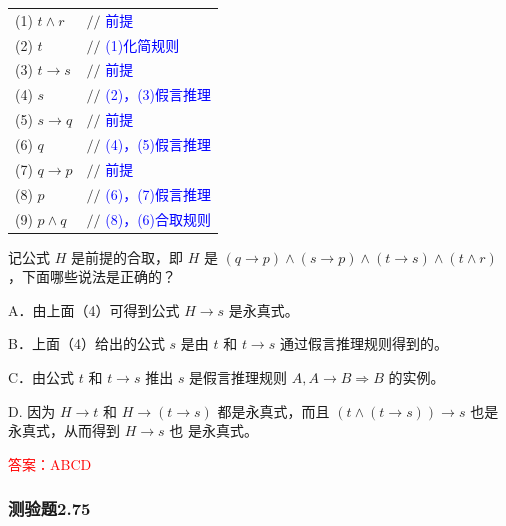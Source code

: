 \documentclass[UTF8, heading=true]{ctexart}
\begin{document}
\begin{table}[htbp]
  \centering
  \renewcommand{\arraystretch}{1.5}
  \begin{tabular}{ll}
    (1)  $t \wedge r$ & $/ / $ \textcolor{blue}{{前提}} \\
    (2)  $t$ & $/ / $ \textcolor{blue}{{(1)化简规则}} \\
    (3)  $t \rightarrow s$ & $/ / $ \textcolor{blue}{{前提}} \\
    (4)  $s$ & $/ / $ \textcolor{blue}{{(2)，(3)假言推理}} \\
    (5)  $s \rightarrow q$ & $/ / $ \textcolor{blue}{{前提}} \\
    (6)  $q$ & $/ / $ \textcolor{blue}{{(4)，(5)假言推理}} \\
    (7)  $q \rightarrow p$ & $/ / $ \textcolor{blue}{{前提}} \\
    (8)  $p$ & $/ / $ \textcolor{blue}{{(6)，(7)假言推理}} \\
    (9)  $p \wedge q$ & $/ / $ \textcolor{blue}{{(8)，(6)合取规则}} \\
  \end{tabular}
\end{table}


记公式 $H$ 是前提的合取，即 $H$ 是 $(q \rightarrow p) \wedge(s \rightarrow p) \wedge(t \rightarrow s) \wedge(t \wedge r)$ ，下面哪些说法是正确的？

A．由上面（4）可得到公式 $H \rightarrow s$ 是永真式。

B．上面（4）给出的公式 $s$ 是由 $t$ 和 $t \rightarrow s$ 通过假言推理规则得到的。

C．由公式 $t$ 和 $t \rightarrow s$ 推出 $s$ 是假言推理规则 $A, A \rightarrow B \Longrightarrow B$ 的实例。

D. 因为 $H \rightarrow t$ 和 $H \rightarrow(t \rightarrow s)$ 都是永真式，而且 $(t \wedge(t \rightarrow s)) \rightarrow s$ 也是永真式，从而得到 $H \rightarrow s$ 也
是永真式。

\textcolor{red}{答案：ABCD}

\subsubsection{测验题2.75}
\end{document}
